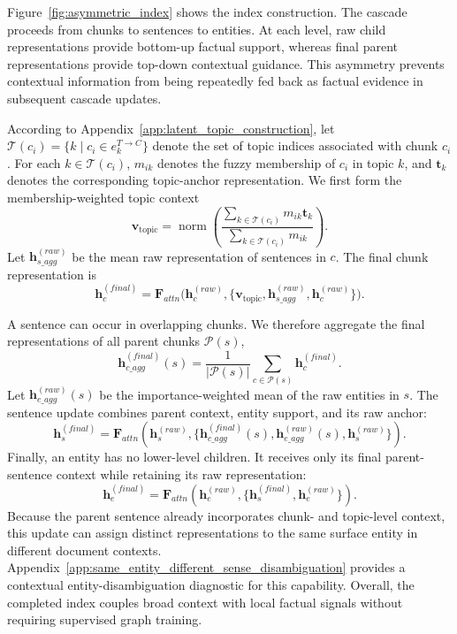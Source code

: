 \documentclass{article} %
\begin{document}
Figure~\ref{fig:asymmetric_index} shows the index construction. The cascade proceeds from chunks to sentences to entities. At each level, raw child representations provide bottom-up factual support, whereas final parent representations provide top-down contextual guidance. This asymmetry prevents contextual information from being repeatedly fed back as factual evidence in subsequent cascade updates.

According to Appendix~\ref{app:latent_topic_construction}, let $\mathcal{T}(c_i)=\{k\mid c_i\in e_k^{T\rightarrow C}\}$ denote the set of topic indices associated with chunk $c_i$. For each $k\in\mathcal{T}(c_i)$, $m_{ik}$ denotes the fuzzy membership of $c_i$ in topic $k$, and $\mathbf{t}_k$ denotes the corresponding topic-anchor representation. We first form the membership-weighted topic context
\begin{equation}
\mathbf{v}_{\mathrm{topic}}=
\operatorname{norm}\!\left(
\frac{\sum_{k\in\mathcal{T}(c_i)}m_{ik}\mathbf{t}_k}
{\sum_{k\in\mathcal{T}(c_i)}m_{ik}}
\right).
\end{equation}
Let $\mathbf{h}_{s\_agg}^{(raw)}$ be the mean raw representation of sentences in $c$. The final chunk representation is
\begin{equation}
\mathbf{h}_{c}^{(final)}=
\mathbf{F}_{attn}\!\bigl(\mathbf{h}_{c}^{(raw)},
\{\mathbf{v}_{\mathrm{topic}},\mathbf{h}_{s\_agg}^{(raw)},\mathbf{h}_{c}^{(raw)}\}\bigr).
\end{equation}

A sentence can occur in overlapping chunks. We therefore aggregate the final representations of all parent chunks $\mathcal{P}(s)$,
\begin{equation}
\mathbf{h}_{c\_agg}^{(final)}(s)=
\frac{1}{|\mathcal{P}(s)|}\sum_{c\in\mathcal{P}(s)}\mathbf{h}_{c}^{(final)}.
\end{equation}
Let $\mathbf{h}_{e\_agg}^{(raw)}(s)$ be the importance-weighted mean of the raw entities in $s$. The sentence update combines parent context, entity support, and its raw anchor:
\begin{equation}
\mathbf{h}_{s}^{(final)}=
\mathbf{F}_{attn}\!\left(
\mathbf{h}_{s}^{(raw)},
\{\mathbf{h}_{c\_agg}^{(final)}(s),\mathbf{h}_{e\_agg}^{(raw)}(s),\mathbf{h}_{s}^{(raw)}\}
\right).
\end{equation}
Finally, an entity has no lower-level children. It receives only its final parent-sentence context while retaining its raw representation:
\begin{equation}
\mathbf{h}_{e}^{(final)}=
\mathbf{F}_{attn}\!\left(
\mathbf{h}_{e}^{(raw)},
\{\mathbf{h}_{s}^{(final)},\mathbf{h}_{e}^{(raw)}\}
\right).
\end{equation}
Because the parent sentence already incorporates chunk- and topic-level context, this update can assign distinct representations to the same surface entity in different document contexts. Appendix~\ref{app:same_entity_different_sense_disambiguation} provides a contextual entity-disambiguation diagnostic for this capability.
Overall, the completed index couples broad context with local factual signals without requiring supervised graph training.
\end{document}
